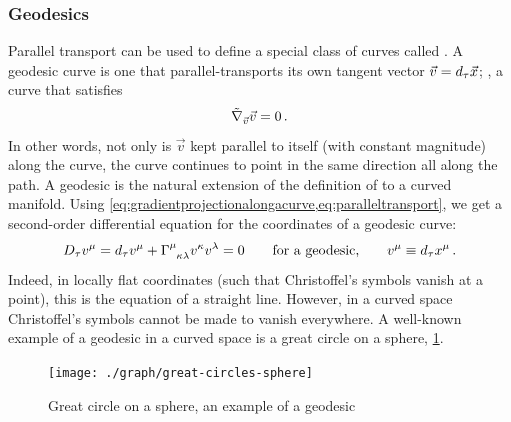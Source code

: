\subsubsection{Geodesics}
%
 Parallel transport can be used to define a special class of curves called . A geodesic curve is one that parallel-transports its own tangent vector $\vec v = d_\tau\vec{x}$; \ie, a curve that satisfies
%
\begin{equation*}
  \cgradcov{\vec v}\vec v = 0\,.
\end{equation*}
%
In other words, not only is $\vec v$ kept parallel to itself (with constant magnitude) along the curve, the curve continues to point in the same direction all along the path. A geodesic is the natural extension of the definition of  to a curved manifold. Using \cref{eq:gradientprojectionalongacurve,eq:paralleltransport}, we get a second-order differential equation for the coordinates of a geodesic curve:
%
\begin{equation}\label{eq:coordinatesofageodesic}
  D_\ptime\tvec v\mu = d_\ptime\tvec v\mu + \tchris\mu\kappa\lambda\tvec v\kappa\tvec v\lambda = 0
    \qquad\text{for a geodesic,}\qquad
  \tvec v\mu \defas d_\ptime\tvec\pos\mu\,.
\end{equation}
%
 Indeed, in locally flat coordinates (such that Christoffel's symbols vanish at a point), this is the equation of a straight line. However, in a curved space Christoffel's symbols cannot be made to vanish everywhere. A well-known example of a geodesic in a curved space is a great circle on a sphere, \cref{fig:greatcirclesonsphere}.
%
%
\begin{figure}[bt]
  \capstart
  \centering
  \texttt{[image: ./graph/great-circles-sphere]}
  \caption{Great circle on a sphere, an example of a geodesic}
  \label{fig:greatcirclesonsphere}
\end{figure}

